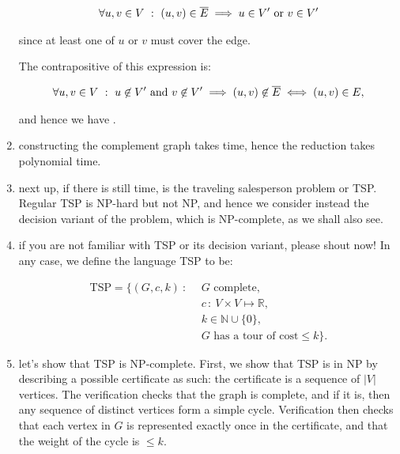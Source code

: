 \begin{enumerate}
    \begin{textred}
    \begin{align}
        \forall u, v \in V\ :\ (u, v) \in \overline{E} \implies u \in V' \text{ or } v \in V'
    \end{align}
    \end{textred}

    since at least one of $u$ or $v$ must cover the edge.

    The contrapositive of this expression is:

    \begin{textred}
    \begin{align}
        \forall u, v \in V\ :\ u \not \in V' \text{ and } v \not \in V' \implies
        (u, v) \not \in \overline{E} \iff (u, v) \in E,
    \end{align}
    \end{textred}

    and hence we have .

  \item constructing the complement graph takes  time, hence the
    reduction takes polynomial time.\\[4pt]


  \item next up, if there is still time, is the traveling salesperson problem or
    TSP. Regular TSP is NP-hard but not NP, and hence we consider instead the
    decision variant of the problem, which is NP-complete, as we shall also see.

  \item if you are not familiar with TSP or its decision variant, please shout
    now! In any case, we define the language TSP to be:

    \begin{textred}
      \begin{align}
        \text{TSP} = \{(G, c, k)\ :\ &\ G \text{ complete},\\
                                   \ &\ c\, :\ V \times V \mapsto \mathbb R,\\
                                   \ &\ k \in \mathbb N \cup \{0\},\\
                                   \ &\ G \text{ has a tour of cost} \leq k\}.
    \end{align}
    \end{textred}

  \item let's show that TSP is NP-complete. First, we show that TSP is in NP by
    describing a possible certificate as such: the certificate is a sequence of
    $|V|$ vertices. The verification checks that the graph is complete, and if
    it is, then any sequence of distinct vertices form a simple cycle.
    Verification then checks that each vertex in $G$ is represented exactly once
    in the certificate, and that the weight of the cycle is $\leq k$.


\end{enumerate}
